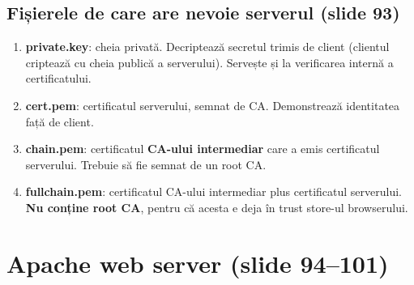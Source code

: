\documentclass[11pt,a4paper]{article}
\begin{document}
\subsection*{Fișierele de care are nevoie serverul (slide 93)}
\begin{enumerate}
  \item \textbf{private.key}: cheia privată. Decriptează secretul trimis de client (clientul criptează cu cheia publică a serverului). Servește și la verificarea internă a certificatului.
  \item \textbf{cert.pem}: certificatul serverului, semnat de CA. Demonstrează identitatea față de client.
  \item \textbf{chain.pem}: certificatul \textbf{CA-ului intermediar} care a emis certificatul serverului. Trebuie să fie semnat de un root CA.
  \item \textbf{fullchain.pem}: certificatul CA-ului intermediar plus certificatul serverului. \textbf{Nu conține root CA}, pentru că acesta e deja în trust store-ul browserului.
\end{enumerate}

\section{Apache web server (slide 94--101)}
\end{document}
